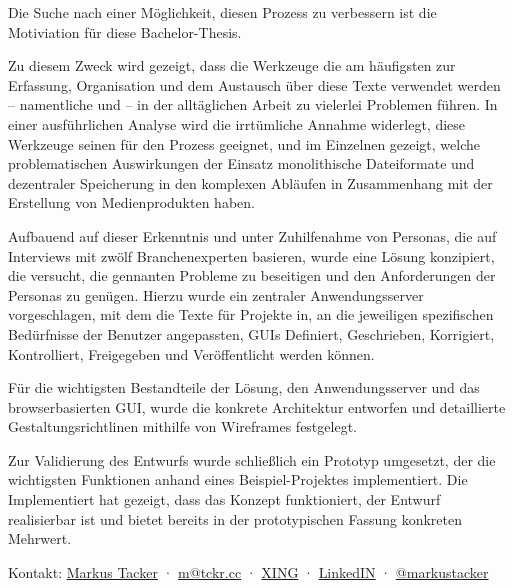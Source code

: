 \documentclass[11pt,a4paper]{article}
\begin{document}
Die Suche nach einer Möglichkeit, diesen Prozess zu verbessern ist die Motiviation für diese Bachelor-Thesis. 

Zu diesem Zweck wird gezeigt, dass die Werkzeuge die am häufigsten zur Erfassung, Organisation und dem Austausch über diese Texte verwendet werden -- namentliche  und  -- in der alltäglichen Arbeit zu vielerlei Problemen führen. In einer ausführlichen Analyse wird die irrtümliche Annahme widerlegt, diese Werkzeuge seinen für den Prozess geeignet, und im Einzelnen gezeigt, welche problematischen Auswirkungen der Einsatz monolithische Dateiformate und dezentraler Speicherung in den komplexen Abläufen in Zusammenhang mit der Erstellung von Medienprodukten haben.

Aufbauend auf dieser Erkenntnis und unter Zuhilfenahme von Personas, die auf Interviews mit zwölf Branchenexperten basieren, wurde eine Lösung konzipiert, die versucht, die gennanten Probleme zu beseitigen und den Anforderungen der Personas zu genügen. Hierzu wurde ein zentraler Anwendungsserver vorgeschlagen, mit dem die Texte für Projekte in, an die jeweiligen spezifischen Bedürfnisse der Benutzer angepassten, GUIs Definiert, Geschrieben, Korrigiert, Kontrolliert, Freigegeben und Veröffentlicht werden können.

Für die wichtigsten Bestandteile der Lösung, den Anwendungsserver und das browserbasierten GUI, wurde die konkrete Architektur entworfen und detaillierte Gestaltungsrichtlinen mithilfe von Wireframes festgelegt.

Zur Validierung des Entwurfs wurde schließlich ein Prototyp umgesetzt, der die wichtigsten Funktionen anhand eines Beispiel-Projektes implementiert. Die Implementiert hat gezeigt, dass das Konzept funktioniert, der Entwurf realisierbar ist und bietet bereits in der prototypischen Fassung konkreten Mehrwert.

\begin{center}
\begin{small}
Kontakt: \href{http://tckr.cc/}{Markus Tacker} · \href{mailto:m@tckr.cc}{m@tckr.cc} · \href{https://www.xing.com/profile/Markus_Tacker}{XING} · \href{http://www.linkedin.com/in/markustacker}{LinkedIN} · \href{http://twitter.com/markustacker}{@markustacker}
\end{small}
\end{center}
\end{document}
